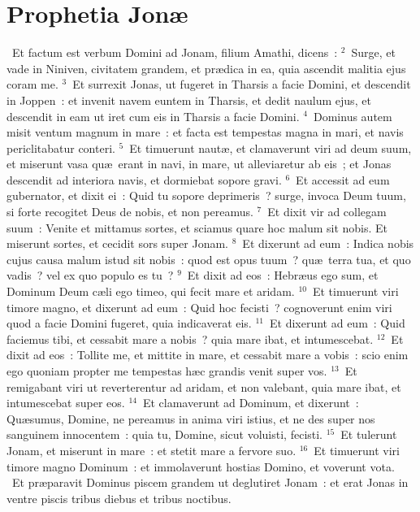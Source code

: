 {\centering \section*{Prophetia Jonæ}}\thispagestyle{empty}

~Et factum est verbum Domini ad Jonam, filium Amathi, dicens~:
${}^{2}$~Surge, et vade in Niniven, civitatem grandem, et pr\ae dica in ea, quia ascendit malitia ejus coram me.
${}^{3}$~Et surrexit Jonas, ut fugeret in Tharsis a facie Domini, et descendit in Joppen~: et invenit navem euntem in Tharsis, et dedit naulum ejus, et descendit in eam ut iret cum eis in Tharsis a facie Domini.
${}^{4}$~Dominus autem misit ventum magnum in mare~: et facta est tempestas magna in mari, et navis periclitabatur conteri.
${}^{5}$~Et timuerunt naut\ae , et clamaverunt viri ad deum suum, et miserunt vasa qu\ae\ erant in navi, in mare, ut alleviaretur ab eis~; et Jonas descendit ad interiora navis, et dormiebat sopore gravi.
${}^{6}$~Et accessit ad eum gubernator, et dixit ei~: Quid tu sopore deprimeris~? surge, invoca Deum tuum, si forte recogitet Deus de nobis, et non pereamus.
${}^{7}$~Et dixit vir ad collegam suum~: Venite et mittamus sortes, et sciamus quare hoc malum sit nobis. Et miserunt sortes, et cecidit sors super Jonam.
${}^{8}$~Et dixerunt ad eum~: Indica nobis cujus causa malum istud sit nobis~: quod est opus tuum~? qu\ae\ terra tua, et quo vadis~? vel ex quo populo es tu~?
${}^{9}$~Et dixit ad eos~: Hebr\ae us ego sum, et Dominum Deum c\ae li ego timeo, qui fecit mare et aridam.
${}^{10}$~Et timuerunt viri timore magno, et dixerunt ad eum~: Quid hoc fecisti~? cognoverunt enim viri quod a facie Domini fugeret, quia indicaverat eis.
${}^{11}$~Et dixerunt ad eum~: Quid faciemus tibi, et cessabit mare a nobis~? quia mare ibat, et intumescebat.
${}^{12}$~Et dixit ad eos~: Tollite me, et mittite in mare, et cessabit mare a vobis~: scio enim ego quoniam propter me tempestas h\ae c grandis venit super vos.
${}^{13}$~Et remigabant viri ut reverterentur ad aridam, et non valebant, quia mare ibat, et intumescebat super eos.
${}^{14}$~Et clamaverunt ad Dominum, et dixerunt~: Qu\ae sumus, Domine, ne pereamus in anima viri istius, et ne des super nos sanguinem innocentem~: quia tu, Domine, sicut voluisti, fecisti.
${}^{15}$~Et tulerunt Jonam, et miserunt in mare~: et stetit mare a fervore suo.
${}^{16}$~Et timuerunt viri timore magno Dominum~: et immolaverunt hostias Domino, et voverunt vota.
~Et pr\ae paravit Dominus piscem grandem ut deglutiret Jonam~: et erat Jonas in ventre piscis tribus diebus et tribus noctibus.
